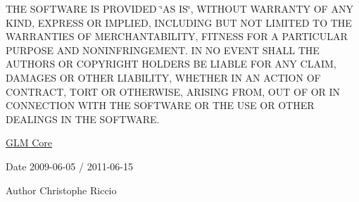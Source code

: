 T\+H\+E S\+O\+F\+T\+W\+A\+R\+E I\+S P\+R\+O\+V\+I\+D\+E\+D \char`\"{}\+A\+S I\+S\char`\"{}, W\+I\+T\+H\+O\+U\+T W\+A\+R\+R\+A\+N\+T\+Y O\+F A\+N\+Y K\+I\+N\+D, E\+X\+P\+R\+E\+S\+S O\+R I\+M\+P\+L\+I\+E\+D, I\+N\+C\+L\+U\+D\+I\+N\+G B\+U\+T N\+O\+T L\+I\+M\+I\+T\+E\+D T\+O T\+H\+E W\+A\+R\+R\+A\+N\+T\+I\+E\+S O\+F M\+E\+R\+C\+H\+A\+N\+T\+A\+B\+I\+L\+I\+T\+Y, F\+I\+T\+N\+E\+S\+S F\+O\+R A P\+A\+R\+T\+I\+C\+U\+L\+A\+R P\+U\+R\+P\+O\+S\+E A\+N\+D N\+O\+N\+I\+N\+F\+R\+I\+N\+G\+E\+M\+E\+N\+T. I\+N N\+O E\+V\+E\+N\+T S\+H\+A\+L\+L T\+H\+E A\+U\+T\+H\+O\+R\+S O\+R C\+O\+P\+Y\+R\+I\+G\+H\+T H\+O\+L\+D\+E\+R\+S B\+E L\+I\+A\+B\+L\+E F\+O\+R A\+N\+Y C\+L\+A\+I\+M, D\+A\+M\+A\+G\+E\+S O\+R O\+T\+H\+E\+R L\+I\+A\+B\+I\+L\+I\+T\+Y, W\+H\+E\+T\+H\+E\+R I\+N A\+N A\+C\+T\+I\+O\+N O\+F C\+O\+N\+T\+R\+A\+C\+T, T\+O\+R\+T O\+R O\+T\+H\+E\+R\+W\+I\+S\+E, A\+R\+I\+S\+I\+N\+G F\+R\+O\+M, O\+U\+T O\+F O\+R I\+N C\+O\+N\+N\+E\+C\+T\+I\+O\+N W\+I\+T\+H T\+H\+E S\+O\+F\+T\+W\+A\+R\+E O\+R T\+H\+E U\+S\+E O\+R O\+T\+H\+E\+R D\+E\+A\+L\+I\+N\+G\+S I\+N T\+H\+E S\+O\+F\+T\+W\+A\+R\+E.

\hyperlink{group__core}{G\+L\+M Core}

\begin{DoxyDate}{Date}
2009-\/06-\/05 / 2011-\/06-\/15 
\end{DoxyDate}
\begin{DoxyAuthor}{Author}
Christophe Riccio 
\end{DoxyAuthor}

